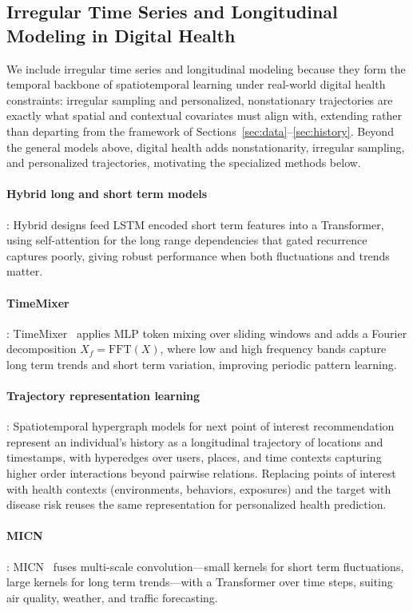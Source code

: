 \documentclass[journal]{IEEEtran}
\begin{document}
 
 
\subsection{Irregular Time Series and Longitudinal Modeling in Digital Health}
We include irregular time series and longitudinal modeling because they form the temporal backbone of spatiotemporal learning under real-world digital health constraints: irregular sampling and personalized, nonstationary trajectories are exactly what spatial and contextual covariates must align with, extending rather than departing from the framework of Sections~\ref{sec:data}--\ref{sec:history}. Beyond the general models above, digital health adds nonstationarity, irregular sampling, and personalized trajectories, motivating the specialized methods below.

\paragraph{Hybrid long and short term models}: Hybrid designs feed LSTM encoded short term features into a Transformer, using self-attention for the long range dependencies that gated recurrence captures poorly, giving robust performance when both fluctuations and trends matter.

\paragraph{TimeMixer}: TimeMixer~\cite{timemixer} applies MLP token mixing over sliding windows and adds a Fourier decomposition $X_f=\mathrm{FFT}(X)$, where low and high frequency bands capture long term trends and short term variation, improving periodic pattern learning.

\paragraph{Trajectory representation learning}: Spatiotemporal hypergraph models for next point of interest recommendation~\cite{Zhang2023POI} represent an individual's history as a longitudinal trajectory of locations and timestamps, with hyperedges over users, places, and time contexts capturing higher order interactions beyond pairwise relations. Replacing points of interest with health contexts (environments, behaviors, exposures) and the target with disease risk reuses the same representation for personalized health prediction.

\paragraph{MICN}: MICN~\cite{wang2023micn} fuses multi-scale convolution---small kernels for short term fluctuations, large kernels for long term trends---with a Transformer over time steps, suiting air quality, weather, and traffic forecasting.
\end{document}
